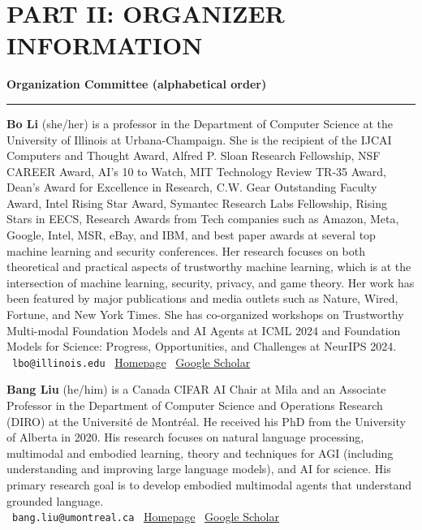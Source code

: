 \documentclass{article}
\newcommand{\orginfo}[3]{\\{\small\faEnvelope\ \texttt{#1} \hfill \faHome\ \href{https://#2}{Homepage} \hfill \faGraduationCap\ \href{https://scholar.google.com/citations?user=#3}{Google Scholar}}}
\newcommand{\sectiontitle}[1]{\noindent\textbf{\textcolor{neuripsblue}{#1}}\vspace{0.1cm}\hrule\vspace{0.2cm}}
\begin{document}
\newpage
 
\newpage
 
\section*{\textcolor{neuripsblue}{\large PART II: ORGANIZER INFORMATION}}
\vspace{-7pt}
\sectiontitle{Organization Committee (alphabetical order)}
\vspace{-2pt}
\textbf{Bo Li} (she/her) is a professor in the Department of Computer Science at the University of Illinois at Urbana-Champaign. She is the recipient of the IJCAI Computers and Thought Award, Alfred P. Sloan Research Fellowship, NSF CAREER Award, AI's 10 to Watch, MIT Technology Review TR-35 Award, Dean's Award for Excellence in Research, C.W. Gear Outstanding Faculty Award, Intel Rising Star Award, Symantec Research Labs Fellowship, Rising Stars in EECS, Research Awards from Tech companies such as Amazon, Meta, Google, Intel, MSR, eBay, and IBM, and best paper awards at several top machine learning and security conferences. Her research focuses on both theoretical and practical aspects of trustworthy machine learning, which is at the intersection of machine learning, security, privacy, and game theory. Her work has been featured by major publications and media outlets such as Nature, Wired, Fortune, and New York Times. She has co-organized workshops on Trustworthy Multi-modal Foundation Models and AI Agents at ICML 2024 and Foundation Models for Science: Progress, Opportunities, and Challenges at NeurIPS 2024.
\orginfo{lbo@illinois.edu}{aisecure.github.io}{K8vJkTcAAAAJ}

\textbf{Bang Liu} (he/him) is a Canada CIFAR AI Chair at Mila and an Associate Professor in the Department of Computer Science and Operations Research (DIRO) at the Université de Montréal. He received his PhD from the University of Alberta in 2020. His research focuses on natural language processing, multimodal and embodied learning, theory and techniques for AGI (including understanding and improving large language models), and AI for science. His primary research goal is to develop embodied multimodal agents that understand grounded language.
\orginfo{bang.liu@umontreal.ca}{https://www-labs.iro.umontreal.ca/~liubang/}{lmfAnP4AAAAJ}
\end{document}
